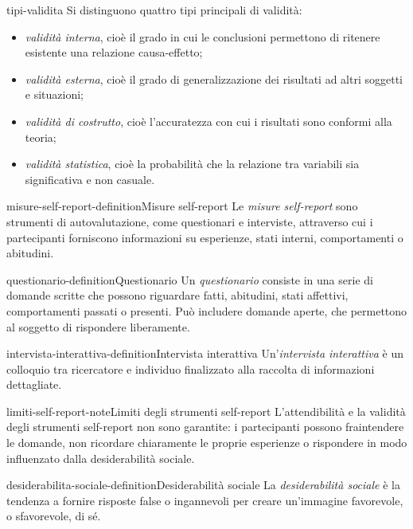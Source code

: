 \documentclass[preview]{standalone}
\begin{document}
\begin{snippet}{tipi-validita}
    Si distinguono quattro tipi principali di validità:
    \begin{itemize}
        \item \emph{validità interna}, cioè il grado in cui le conclusioni
        permettono di ritenere esistente una relazione causa-effetto;
        \item \emph{validità esterna}, cioè il grado di generalizzazione dei
        risultati ad altri soggetti e situazioni;
        \item \emph{validità di costrutto}, cioè l'accuratezza con cui i
        risultati sono conformi alla teoria;
        \item \emph{validità statistica}, cioè la probabilità che la relazione
        tra variabili sia significativa e non casuale.
    \end{itemize}
\end{snippet}

\begin{snippetdefinition}{misure-self-report-definition}{Misure self-report}
    Le \emph{misure self-report} sono strumenti di autovalutazione, come
    questionari e interviste, attraverso cui i partecipanti forniscono
    informazioni su esperienze, stati interni, comportamenti o abitudini.
\end{snippetdefinition}

\begin{snippetdefinition}{questionario-definition}{Questionario}
    Un \emph{questionario} consiste in una serie di domande scritte che possono
    riguardare fatti, abitudini, stati affettivi, comportamenti passati o
    presenti. Può includere domande aperte, che permettono al soggetto di
    rispondere liberamente.
\end{snippetdefinition}

\begin{snippetdefinition}{intervista-interattiva-definition}{Intervista interattiva}
    Un'\emph{intervista interattiva} è un colloquio tra ricercatore e individuo
    finalizzato alla raccolta di informazioni dettagliate.
\end{snippetdefinition}

\begin{snippetnote}{limiti-self-report-note}{Limiti degli strumenti self-report}
    L'attendibilità e la validità degli strumenti self-report non sono
    garantite: i partecipanti possono fraintendere le domande, non ricordare
    chiaramente le proprie esperienze o rispondere in modo influenzato dalla
    desiderabilità sociale.
\end{snippetnote}


\begin{snippetdefinition}{desiderabilita-sociale-definition}{Desiderabilità sociale}
    La \emph{desiderabilità sociale} è la tendenza a fornire risposte false o
    ingannevoli per creare un'immagine favorevole, o sfavorevole, di sé.
\end{snippetdefinition}
\end{document}
